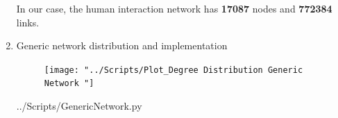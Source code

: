 \documentclass[10pt,a4paper]{article}
\begin{document}
\begin{enumerate}
	In our case, the human interaction network has \textbf{17087} nodes and \textbf{772384} links.
	
	
	\item Generic network distribution and implementation 
	
	
\begin{figure}[H]
	\centering
	\texttt{[image: "../Scripts/Plot\_Degree Distribution Generic Network "]}
	\caption[Human interaction network plot]{}
	\caption{}
	\label{fig:plot4degree-distribution-generic-network-}
\end{figure}
	
	 {../Scripts/GenericNetwork.py}
	
	
	
\end{enumerate}	
	
\end{document}
